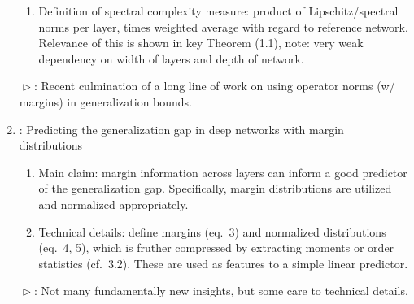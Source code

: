 \documentclass[10pt,a4paper]{article}
\renewcommand{\th}{$\vartriangleright$}
\begin{document}
\begin{enumerate}
\begin{enumerate}
\item Definition of spectral complexity measure: product of Lipschitz/spectral norms per layer, times weighted average with regard to reference network.  Relevance of this is shown in key Theorem (1.1), note: very weak dependency on width of layers and depth of network. 
\end{enumerate}
\th: Recent culmination of a long line of work on using operator norms (w/ margins) in generalization bounds. 
\item \cite{jiang2018predicting}: Predicting the generalization gap in deep networks with margin distributions
\begin{enumerate}
\item Main claim:  margin information across layers can inform a good predictor of the generalization gap. Specifically, margin distributions are utilized and normalized appropriately. 
\item Technical details: define margins (eq.~3) and normalized distributions (eq.~4, 5), which is fruther compressed by extracting moments or order statistics (cf.~3.2). These are used as features to a simple linear predictor. 
\end{enumerate}
\th: Not many fundamentally new insights, but some care to technical details.
\end{enumerate}





\end{document}
